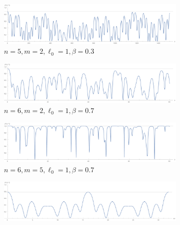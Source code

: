 \begin{figure}[!h]
  \begin{subfigure}[t]{\textwidth}
    \includegraphics[width=1\textwidth]{img/reflection_n=5_m=2_l=1_b=03_kmax=1500}
    \caption{$n=5, m=2, \ell_0=1, \beta=0.3$}
  \end{subfigure}
  \begin{subfigure}[t]{\textwidth}
    \includegraphics[width=1\textwidth]{img/reflection_n=6_m=2_l=1_b=07_kmax=80}
    \caption{$n=6, m=2, \ell_0=1, \beta=0.7$}
  \end{subfigure}
  \begin{subfigure}[t]{\textwidth}
    \includegraphics[width=1\textwidth]{img/reflection_n=6_m=5_l=1_b=07_kmax=80}
    \caption{$n=6, m=5, \ell_0=1, \beta=0.7$}
  \end{subfigure}
  \begin{subfigure}[t]{\textwidth}
    \includegraphics[width=1\textwidth]{img/reflection_n=4_m=2_l=1_b=05_kmax=32pi}

\end{subfigure}
\end{figure}

